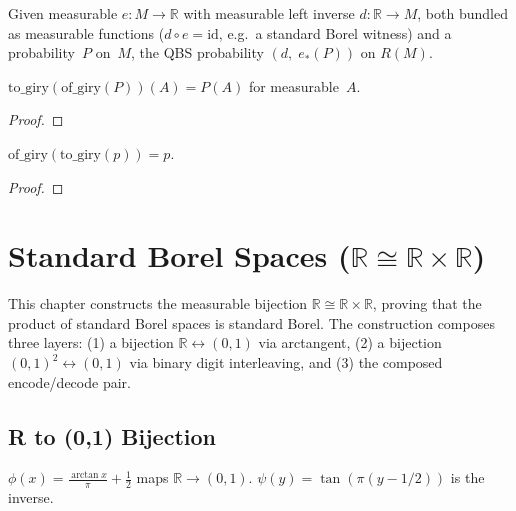 \begin{definition}\label{def:of_giry}
  \rocqok
  Given measurable $e : M \to \mathbb{R}$ with measurable left inverse
  $d : \mathbb{R} \to M$, both bundled as measurable functions ($d \circ e = \mathrm{id}$, e.g.\ a standard Borel
  witness) and a probability~$P$ on~$M$, the QBS probability
  $(d,\; e_*(P))$ on $R(M)$.
\end{definition}

\begin{lemma}\label{lem:to_giryK}
  \rocqok
  $\mathrm{to\_giry}(\mathrm{of\_giry}(P))(A) = P(A)$ for
  measurable~$A$.
\end{lemma}
\begin{proof}\rocqok\end{proof}

\begin{lemma}\label{lem:of_giryK}
  \rocqok
  $\mathrm{of\_giry}(\mathrm{to\_giry}(p)) = p$.
\end{lemma}
\begin{proof}\rocqok\end{proof}


\chapter{Standard Borel Spaces ($\mathbb{R} \cong \mathbb{R} \times \mathbb{R}$)}\label{ch:standard_borel}

This chapter constructs the measurable bijection
$\mathbb{R} \cong \mathbb{R} \times \mathbb{R}$, proving that
the product of standard Borel spaces is standard Borel.
The construction composes three layers: (1) a bijection
$\mathbb{R} \leftrightarrow (0,1)$ via arctangent, (2) a bijection
$(0,1)^2 \leftrightarrow (0,1)$ via binary digit interleaving,
and (3) the composed encode/decode pair.

\section{R to (0,1) Bijection}\label{sec:phi_psi}

\begin{definition}\label{def:phi_psi}
  \rocqok
  $\phi(x) = \frac{\arctan x}{\pi} + \frac{1}{2}$ maps
  $\mathbb{R} \to (0,1)$.
  $\psi(y) = \tan(\pi(y - 1/2))$ is the inverse.
\end{definition}

